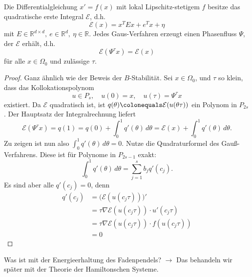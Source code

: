 \documentclass[german]{scrreprt}
\newcommand{\R}{\mathbb R}
\theoremstyle{plain}
\theoremstyle{nonumberplain}
\theoremstyle{nonumberplain}
\theoremstyle{nonumberplain}
\newtheorem{proof}{Beweis}
\begin{document}
\begin{satz}
	Die Differentialgleichung $x'=f(x)$ mit lokal Lipschitz-stetigem $f$ besitze das quadratische erste Integral $\mathcal E$, d.h.
	\begin{equation*}
	\mathcal E(x) = x^T E x + e^T x + \eta
	\end{equation*}
	mit $E\in\R^{d\times d},\ e\in\R^d,\ \eta\in\R$. Jedes Gaus-Verfahren erzeugt einen Phasenfluss $\Psi$, der $\mathcal E$ erhält, d.h.
	\begin{equation*}
	\mathcal E(\Psi^\tau x) = \mathcal E(x)
	\end{equation*}
	für alle $x\in\Omega_0$ und zulässige $\tau$.
\end{satz}
\begin{proof}
	Ganz ähnlich wie der Beweis der $B$-Stabilität.
	Sei $x\in\Omega_0$, und $\tau$ so klein, dass das Kollokationspolynom
	\begin{equation*}
	u\in P_s,\quad u(0)=x,\quad u(\tau) = \Psi^\tau x
	\end{equation*}
	existiert. Da $\mathcal E$ quadratisch ist, ist $q(\theta) \colonequals \mathcal E(u(\theta\tau))$ ein Polynom in $P_{2s}$.
	Der Hauptsatz der Integralrechnung liefert
	\begin{equation*}
	\mathcal E(\Psi^\tau x) = q(1) = q(0) + \int_0^1q'(\theta)\,d\theta = \mathcal E(x) + \int_0^1q'(\theta)\,d\theta . 
	\end{equation*}
	Zu zeigen ist nun also $\int_0^1q'(\theta)\,d\theta =0$.
	Nutze die Quadraturformel des Gauß-Verfahrens. Diese ist für Polynome in $P_{2s-1}$ exakt:
	\begin{equation*}
	\int_0^1q'(\theta)\,d\theta = \sum_{j=1}^s b_j q'(c_j).
	\end{equation*}
	Es sind aber alle $q'(c_j)=0$, denn
	\begin{align*}
	q'(c_j) 
	&= \big(\mathcal E(u(c_j\tau))\big)' \\
	&= \tau\nabla\mathcal E(u(c_j\tau))\cdot u'(c_j\tau) \tag{Kettenregel} \\
	&= \tau\nabla\mathcal E(u(c_j\tau))\cdot f(u(c_j\tau)) \tag{Kollokationseigenschaft} \\
	&= 0 \tag{da $\mathcal E$ eine Invariante ist}
	\end{align*}
\end{proof}

Was ist mit der Energieerhaltung des Fadenpendels? $\to$ Das behandeln wir später mit der Theorie der Hamiltonschen Systeme.




\end{document}
